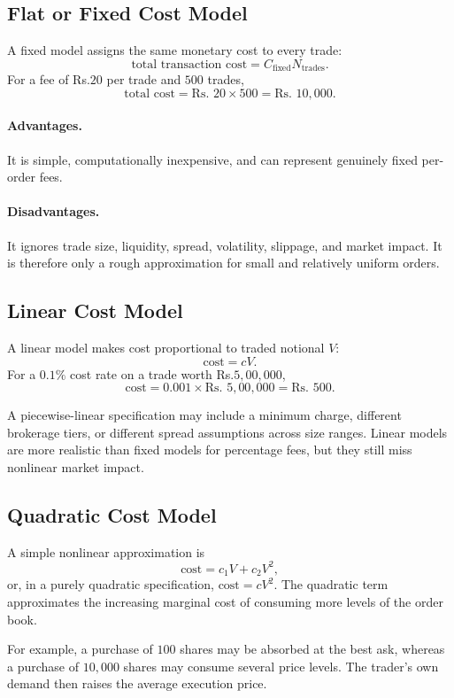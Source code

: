 \documentclass[12pt,openany]{book}
\theoremstyle{definition}
\theoremstyle{remark}
\begin{document}
\subsection{Flat or Fixed Cost Model}

A fixed model assigns the same monetary cost to every trade:
\[
\text{total transaction cost}
 =C_{\mathrm{fixed}}N_{\mathrm{trades}}.
\]
For a fee of Rs.\(20\) per trade and \(500\) trades,
\[
\text{total cost}=\text{Rs. }20\times500=\text{Rs. }10{,}000.
\]

\paragraph{Advantages.}
It is simple, computationally inexpensive, and can represent genuinely
fixed per-order fees.

\paragraph{Disadvantages.}
It ignores trade size, liquidity, spread, volatility, slippage, and market
impact. It is therefore only a rough approximation for small and relatively
uniform orders.

\subsection{Linear Cost Model}

A linear model makes cost proportional to traded notional \(V\):
\[
\text{cost}=cV.
\]
For a \(0.1\%\) cost rate on a trade worth Rs.\(5{,}00{,}000\),
\[
\text{cost}=0.001\times\text{Rs. }5{,}00{,}000=\text{Rs. }500.
\]

A piecewise-linear specification may include a minimum charge, different
brokerage tiers, or different spread assumptions across size ranges. Linear
models are more realistic than fixed models for percentage fees, but they
still miss nonlinear market impact.

\subsection{Quadratic Cost Model}

A simple nonlinear approximation is
\[
\text{cost}=c_1V+c_2V^2,
\]
or, in a purely quadratic specification, \(\text{cost}=cV^2\). The
quadratic term approximates the increasing marginal cost of consuming more
levels of the order book.

For example, a purchase of \(100\) shares may be absorbed at the best ask,
whereas a purchase of \(10{,}000\) shares may consume several price levels.
The trader's own demand then raises the average execution price.
\end{document}
